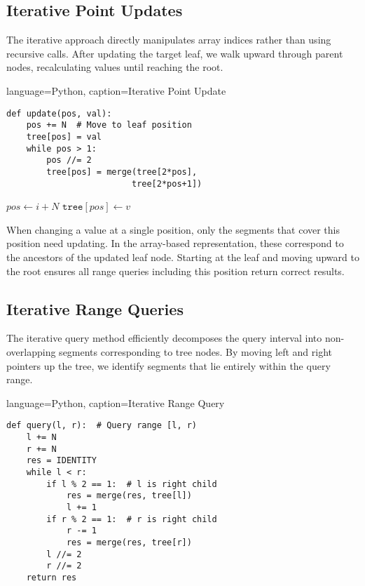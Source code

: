 \subsection{Iterative Point Updates}

The iterative approach directly manipulates array indices rather than using recursive calls. After updating the target leaf, we walk upward through parent nodes, recalculating values until reaching the root.

\begin{marginlisting}[0pt]{language=Python, caption=Iterative Point Update}
\begin{lstlisting}
def update(pos, val):
    pos += N  # Move to leaf position
    tree[pos] = val
    while pos > 1:
        pos //= 2
        tree[pos] = merge(tree[2*pos], 
                         tree[2*pos+1])
\end{lstlisting}
\end{marginlisting}

\begin{algorithm}[H]
\SetAlgoLined
{}
$pos \leftarrow i + N$\;
$\texttt{tree}[pos] \leftarrow v$\;
\caption{Iterative point update in a 1-based segment tree}
\end{algorithm}

When changing a value at a single position, only the segments that cover this position need updating. In the array-based representation, these correspond to the ancestors of the updated leaf node. Starting at the leaf and moving upward to the root ensures all range queries including this position return correct results.

\subsection{Iterative Range Queries}

The iterative query method efficiently decomposes the query interval into non-overlapping segments corresponding to tree nodes. By moving left and right pointers up the tree, we identify segments that lie entirely within the query range.

\begin{marginlisting}[0pt]{language=Python, caption=Iterative Range Query}
\begin{lstlisting}
def query(l, r):  # Query range [l, r)
    l += N
    r += N
    res = IDENTITY
    while l < r:
        if l % 2 == 1:  # l is right child
            res = merge(res, tree[l])
            l += 1
        if r % 2 == 1:  # r is right child
            r -= 1
            res = merge(res, tree[r])
        l //= 2
        r //= 2
    return res
\end{lstlisting}
\end{marginlisting}

